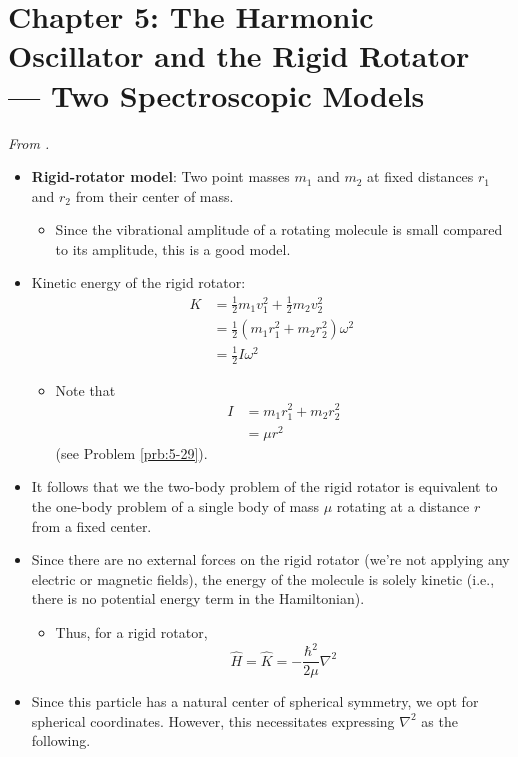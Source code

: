 \documentclass[../notes.tex]{subfiles}
\begin{document}
\section{Chapter 5: The Harmonic Oscillator and the Rigid Rotator --- Two Spectroscopic Models}
\emph{From \textcite{bib:McQuarrieSimon}.}
\begin{itemize}
    \item {}\textbf{Rigid-rotator model}: Two point masses $m_1$ and $m_2$ at fixed distances $r_1$ and $r_2$ from their center of mass.
    \begin{itemize}
        \item Since the vibrational amplitude of a rotating molecule is small compared to its amplitude, this is a good model.
    \end{itemize}
    \item Kinetic energy of the rigid rotator:
    \begin{align*}
        K &= \frac{1}{2}m_1v_1^2+\frac{1}{2}m_2v_2^2\\
        &= \frac{1}{2}(m_1r_1^2+m_2r_2^2)\omega^2\\
        &= \frac{1}{2}I\omega^2
    \end{align*}
    \begin{itemize}
        \item Note that
        \begin{align*}
            I &= m_1r_1^2+m_2r_2^2\\
            &= \mu r^2
        \end{align*}
        (see Problem \ref{prb:5-29}).
    \end{itemize}
    \item It follows that we the two-body problem of the rigid rotator is equivalent to the one-body problem of a single body of mass $\mu$ rotating at a distance $r$ from a fixed center.
    \item Since there are no external forces on the rigid rotator (we're not applying any electric or magnetic fields), the energy of the molecule is solely kinetic (i.e., there is no potential energy term in the Hamiltonian).
    \begin{itemize}
        \item Thus, for a rigid rotator,
        \begin{equation*}
            \hat{H} = \hat{K} = -\frac{\hbar^2}{2\mu}\nabla^2
        \end{equation*}
    \end{itemize}
    \item Since this particle has a natural center of spherical symmetry, we opt for spherical coordinates. However, this necessitates expressing $\nabla^2$ as the following.

\end{itemize}
\end{document}
